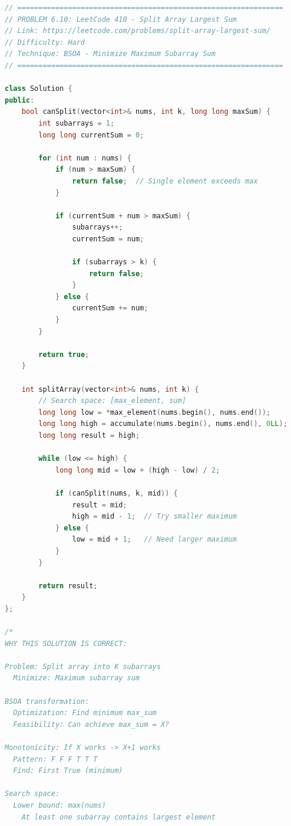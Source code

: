\documentclass[11pt,a4paper,oneside]{book}
\begin{document}
\begin{lstlisting}[language=C++, caption=Complete BSOA Solutions - Minimize Maximum]
// ===============================================================
// PROBLEM 6.10: LeetCode 410 - Split Array Largest Sum
// Link: https://leetcode.com/problems/split-array-largest-sum/
// Difficulty: Hard
// Technique: BSOA - Minimize Maximum Subarray Sum
// ===============================================================

class Solution {
public:
    bool canSplit(vector<int>& nums, int k, long long maxSum) {
        int subarrays = 1;
        long long currentSum = 0;
        
        for (int num : nums) {
            if (num > maxSum) {
                return false;  // Single element exceeds max
            }
            
            if (currentSum + num > maxSum) {
                subarrays++;
                currentSum = num;
                
                if (subarrays > k) {
                    return false;
                }
            } else {
                currentSum += num;
            }
        }
        
        return true;
    }
    
    int splitArray(vector<int>& nums, int k) {
        // Search space: [max_element, sum]
        long long low = *max_element(nums.begin(), nums.end());
        long long high = accumulate(nums.begin(), nums.end(), 0LL);
        long long result = high;
        
        while (low <= high) {
            long long mid = low + (high - low) / 2;
            
            if (canSplit(nums, k, mid)) {
                result = mid;
                high = mid - 1;  // Try smaller maximum
            } else {
                low = mid + 1;   // Need larger maximum
            }
        }
        
        return result;
    }
};

/*
WHY THIS SOLUTION IS CORRECT:

Problem: Split array into K subarrays
  Minimize: Maximum subarray sum

BSOA transformation:
  Optimization: Find minimum max_sum
  Feasibility: Can achieve max_sum = X?

Monotonicity: If X works -> X+1 works
  Pattern: F F F T T T
  Find: First True (minimum)

Search space:
  Lower bound: max(nums)
    At least one subarray contains largest element
  

\end{lstlisting}
\end{document}
